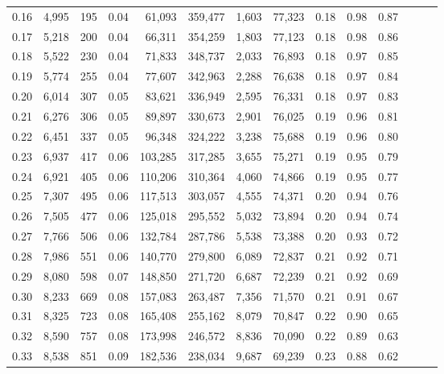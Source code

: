 \begin{tabular}{rrrrrrrrrrrrrr}
0.16 &   4,995 &    195 &  0.04 &   61,093 &  359,477 &   1,603 &  77,323 &  0.18 &  0.98 &      0.87 \\
0.17 &   5,218 &    200 &  0.04 &   66,311 &  354,259 &   1,803 &  77,123 &  0.18 &  0.98 &      0.86 \\
0.18 &   5,522 &    230 &  0.04 &   71,833 &  348,737 &   2,033 &  76,893 &  0.18 &  0.97 &      0.85 \\
0.19 &   5,774 &    255 &  0.04 &   77,607 &  342,963 &   2,288 &  76,638 &  0.18 &  0.97 &      0.84 \\
0.20 &   6,014 &    307 &  0.05 &   83,621 &  336,949 &   2,595 &  76,331 &  0.18 &  0.97 &      0.83 \\
0.21 &   6,276 &    306 &  0.05 &   89,897 &  330,673 &   2,901 &  76,025 &  0.19 &  0.96 &      0.81 \\
0.22 &   6,451 &    337 &  0.05 &   96,348 &  324,222 &   3,238 &  75,688 &  0.19 &  0.96 &      0.80 \\
0.23 &   6,937 &    417 &  0.06 &  103,285 &  317,285 &   3,655 &  75,271 &  0.19 &  0.95 &      0.79 \\
0.24 &   6,921 &    405 &  0.06 &  110,206 &  310,364 &   4,060 &  74,866 &  0.19 &  0.95 &      0.77 \\
0.25 &   7,307 &    495 &  0.06 &  117,513 &  303,057 &   4,555 &  74,371 &  0.20 &  0.94 &      0.76 \\
0.26 &   7,505 &    477 &  0.06 &  125,018 &  295,552 &   5,032 &  73,894 &  0.20 &  0.94 &      0.74 \\
0.27 &   7,766 &    506 &  0.06 &  132,784 &  287,786 &   5,538 &  73,388 &  0.20 &  0.93 &      0.72 \\
0.28 &   7,986 &    551 &  0.06 &  140,770 &  279,800 &   6,089 &  72,837 &  0.21 &  0.92 &      0.71 \\
0.29 &   8,080 &    598 &  0.07 &  148,850 &  271,720 &   6,687 &  72,239 &  0.21 &  0.92 &      0.69 \\
0.30 &   8,233 &    669 &  0.08 &  157,083 &  263,487 &   7,356 &  71,570 &  0.21 &  0.91 &      0.67 \\
0.31 &   8,325 &    723 &  0.08 &  165,408 &  255,162 &   8,079 &  70,847 &  0.22 &  0.90 &      0.65 \\
0.32 &   8,590 &    757 &  0.08 &  173,998 &  246,572 &   8,836 &  70,090 &  0.22 &  0.89 &      0.63 \\
0.33 &   8,538 &    851 &  0.09 &  182,536 &  238,034 &   9,687 &  69,239 &  0.23 &  0.88 &      0.62 \\

\end{tabular}
